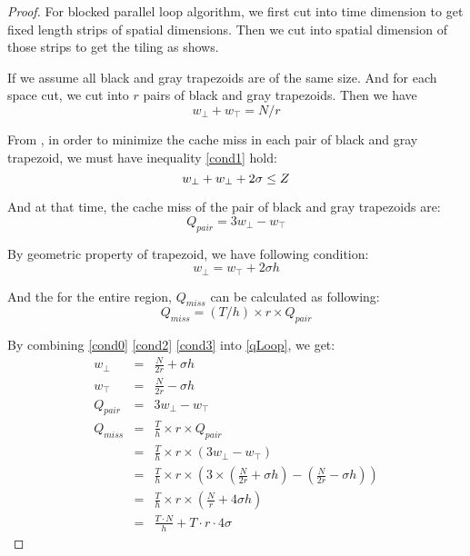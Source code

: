 \begin{proof}
For blocked parallel loop algorithm, we first cut into time dimension
to get fixed length strips of spatial dimensions. Then we cut into spatial
dimension of those strips to get the tiling as 
shows.

If we assume all black and gray trapezoids are of the same size. And for 
each space cut, we cut into $r$ pairs of black and gray trapezoids. Then we have
\begin{equation}
w_{\bot} + w_{\top} = N/r \label{eq:cond0}
\end{equation}

From 
, in order to minimize the cache miss in
each pair of black and gray trapezoid, we must have inequality \eqref{cond1} hold:
\begin{equation}
w_{\bot} + w_{\bot} + 2 \sigma \leq Z \label{eq:cond1} \\
\end{equation}

And at that time, the cache miss of the pair of black and gray trapezoids are:
\begin{equation}
Q_{pair} = 3 w_{\bot} - w_{\top} \label{eq:cond2}
\end{equation}

By geometric property of trapezoid, we have following condition:
\begin{equation}
w_{\bot} = w_{\top} + 2 \sigma h \label{eq:cond3} 
\end{equation}

And the for the entire region, $Q_{miss}$ can be calculated as following:
\begin{equation}
Q_{miss} = (T/h) \times r \times Q_{pair} \label{eq:qLoop}
\end{equation}

By combining \eqref{cond0} \eqref{cond2} \eqref{cond3} into \eqref{qLoop}, we get:
\begin{eqnarray}
w_{\bot} & = & \frac{N}{2r} + \sigma h \\
w_{\top} & = & \frac{N}{2r} - \sigma h \\
Q_{pair} & = & 3 w_{\bot} - w_{\top} \\
Q_{miss} & = & \frac{T}{h} \times r \times Q_{pair} \\
		 & = & \frac{T}{h} \times r \times (3 w_{\bot} - w_{\top}) \\
		 & = & \frac{T}{h} \times r \times (3 \times (\frac{N}{2r} + \sigma h) - (\frac{N}{2r} - \sigma h)) \\
		 & = & \frac{T}{h} \times r \times (\frac{N}{r} + 4 \sigma h) \\
		 & = & \frac{T \cdot N}{h} + T \cdot r \cdot 4 \sigma \label{eq:qLoop1}
\end{eqnarray}


\end{proof}
